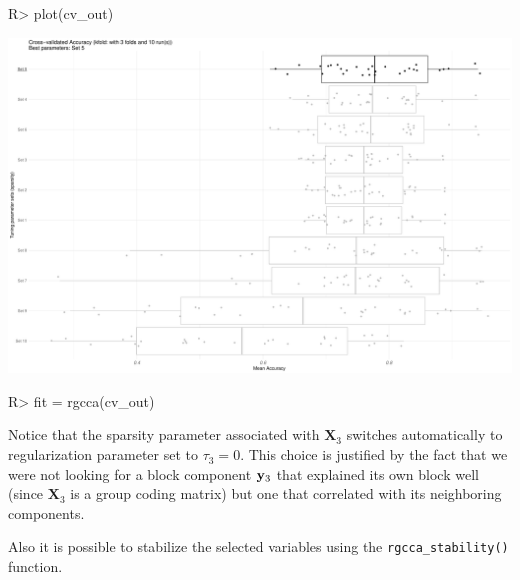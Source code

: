 \documentclass[
]{jss}
\begin{document}
\normalsize

\footnotesize

\begin{CodeChunk}
\begin{CodeInput}
R> plot(cv_out)
\end{CodeInput}


\begin{center}\includegraphics{RGCCA_vignette_files/figure-latex/unnamed-chunk-42-1} \end{center}

\end{CodeChunk}

\normalsize

\footnotesize

\begin{CodeChunk}
\begin{CodeInput}
R> fit = rgcca(cv_out)
\end{CodeInput}
\end{CodeChunk}

\normalsize

Notice that the sparsity parameter associated with \(\mathbf{X}_3\)
switches automatically to regularization parameter set to
\(\tau_3 = 0\). This choice is justified by the fact that we were not
looking for a block component \(\mathbf{y}_3\) that explained its own block well
(since \(\mathbf{X}_3\) is a group coding matrix) but one that
correlated with its neighboring components.

Also it is possible to stabilize the selected variables using the
\texttt{rgcca\_stability()} function.

\footnotesize

\begin{CodeChunk}
\end{CodeChunk}
\end{document}

